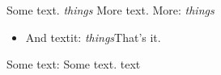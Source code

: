 Some text.
\emph{things}
More text.
More:
\emph{things}
\begin{itemize}
\item And textit:
\textit{things}That’s it.
\end{itemize}
Some text:
Some text.
text

